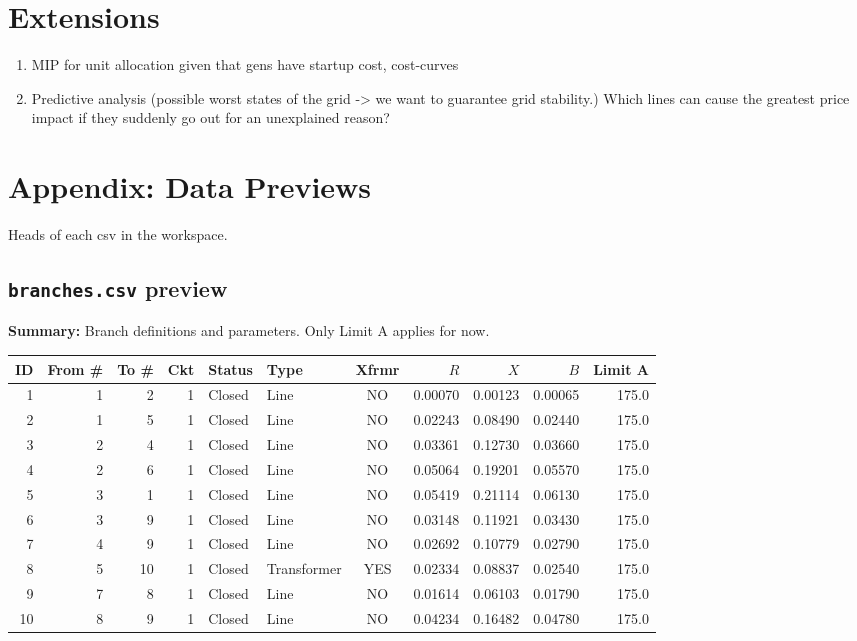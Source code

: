 \documentclass[11pt]{article}
\begin{document}
\section{Extensions}
\begin{enumerate}
    \item MIP for unit allocation given that gens have startup cost, cost-curves
    \item Predictive analysis (possible worst states of the grid -> we want to guarantee grid stability.) Which lines can cause the greatest price impact if they suddenly go out for an unexplained reason?
\end{enumerate}

\appendix
\newpage
\section{Appendix: Data Previews}

Heads of each csv in the workspace.

\subsection{\texttt{branches.csv} preview}\label{app:branches-preview}
\textbf{Summary:} Branch definitions and parameters. Only Limit A applies for now.

\scriptsize
\begin{longtable}{@{}rrrrllcrrrr@{}}
\toprule
ID & From \# & To \# & Ckt & Status & Type & Xfrmr & $R$ & $X$ & $B$ & Limit A \\
\midrule
\endhead
1  & 1 & 2  & 1 & Closed & Line        & NO  & 0.00070 & 0.00123 & 0.00065 & 175.0 \\
2  & 1 & 5  & 1 & Closed & Line        & NO  & 0.02243 & 0.08490 & 0.02440 & 175.0 \\
3  & 2 & 4  & 1 & Closed & Line        & NO  & 0.03361 & 0.12730 & 0.03660 & 175.0 \\
4  & 2 & 6  & 1 & Closed & Line        & NO  & 0.05064 & 0.19201 & 0.05570 & 175.0 \\
5  & 3 & 1  & 1 & Closed & Line        & NO  & 0.05419 & 0.21114 & 0.06130 & 175.0 \\
6  & 3 & 9  & 1 & Closed & Line        & NO  & 0.03148 & 0.11921 & 0.03430 & 175.0 \\
7  & 4 & 9  & 1 & Closed & Line        & NO  & 0.02692 & 0.10779 & 0.02790 & 175.0 \\
8  & 5 & 10 & 1 & Closed & Transformer & YES & 0.02334 & 0.08837 & 0.02540 & 175.0 \\
9  & 7 & 8  & 1 & Closed & Line        & NO  & 0.01614 & 0.06103 & 0.01790 & 175.0 \\
10 & 8 & 9  & 1 & Closed & Line        & NO  & 0.04234 & 0.16482 & 0.04780 & 175.0 \\
\bottomrule
\end{longtable}
\normalsize
\end{document}
